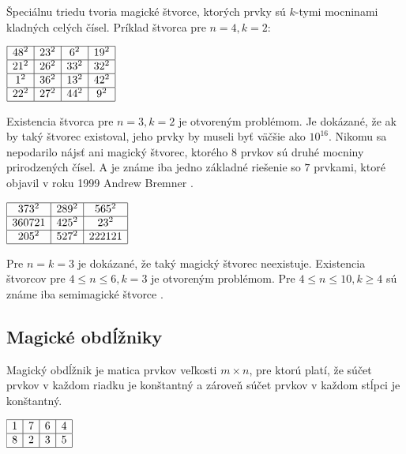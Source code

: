 Špeciálnu triedu tvoria magické štvorce, ktorých prvky sú $k$-tymi mocninami kladných celých čísel. Príklad štvorca pre $n = 4, k = 2$:

\begin{center}
$\begin{array}{ |c|c|c|c| } 
\hline
48^2 & 23^2 & 6^2 & 19^2 \\ 
\hline
21^2 & 26^2 & 33^2 & 32^2 \\ 
\hline
1^2 & 36^2 & 13^2 & 42^2 \\
\hline
22^2 & 27^2 & 44^2 & 9^2 \\
\hline
\end{array}$
\end{center}

Existencia štvorca pre $n = 3, k = 2$ je otvoreným problémom. Je dokázané, že ak by taký štvorec existoval, jeho prvky by museli byť väčšie ako $10^{16}$. Nikomu sa nepodarilo nájsť ani magický štvorec, ktorého $8$ prvkov sú druhé mocniny prirodzených čísel. A je známe iba jedno základné riešenie so $7$ prvkami, ktoré objavil v roku 1999 Andrew Bremner \cite{multimagie}.

\begin{center}
$\begin{array}{ |c|c|c| } 
\hline
373^2 & 289^2 & 565^2 \\ 
\hline
360721 & 425^2 & 23^2 \\ 
\hline
205^2 & 527^2 & 222121 \\
\hline
\end{array}$
\end{center}

Pre $n = k = 3$ je dokázané, že taký magický štvorec neexistuje. Existencia štvorcov pre $4 \leq n \leq 6, k = 3$ je otvoreným problémom. Pre $4 \leq n \leq 10, k \geq 4$ sú známe iba semimagické štvorce \cite{multimagie}.

\subsection{Magické obdĺžniky}
\begin{definition} Magický obdĺžnik je matica prvkov veľkosti $m \times n$, pre ktorú platí, že súčet prvkov v každom riadku je konštantný a zároveň súčet prvkov v každom stĺpci je konštantný.
\end{definition}

\begin{center}
$\begin{array}{ |c|c|c|c| } 
\hline
1 & 7 & 6 & 4 \\ 
\hline
8 & 2 & 3 & 5 \\
\hline
\end{array}$
\end{center}

